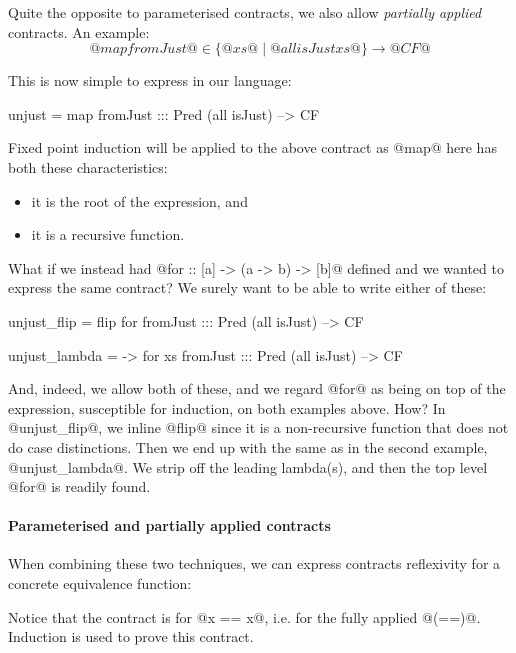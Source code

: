 Quite the opposite to parameterised contracts, we also allow
\emph{partially applied} contracts. An example:
$$@map fromJust@ \in \{ @xs@ \mid @all isJust xs@ \} \to @CF@$$

This is now simple to express in our language:

\begin{code}
unjust = map fromJust ::: Pred (all isJust) --> CF
\end{code}

Fixed point induction will be applied to the above contract as @map@
here has both these characteristics:
\begin{itemize}
   \item it is the root of the expression, and
   \item it is a recursive function.
\end{itemize}

What if we instead had @for :: [a] -> (a -> b) -> [b]@ defined
and we wanted to express the same contract? We surely want to
be able to write either of these:

\begin{code}
unjust_flip = flip for fromJust
                    ::: Pred (all isJust) --> CF

unjust_lambda = \xs -> for xs fromJust
                    ::: Pred (all isJust) --> CF
\end{code}

And, indeed, we allow both of these, and we regard @for@ as being on
top of the expression, susceptible for induction, on both examples
above. How? In @unjust_flip@, we inline @flip@ since it is a
non-recursive function that does not do case distinctions. Then we end
up with the same as in the second example, @unjust_lambda@. We strip off the leading
lambda(s), and then the top level @for@ is readily found.

\paragraph{Parameterised and partially applied contracts}

When combining these two techniques, we can express contracts
reflexivity for a concrete equivalence function:


Notice that the contract is for @x == x@, i.e. for the fully applied @(==)@.
Induction is used to prove this contract.

